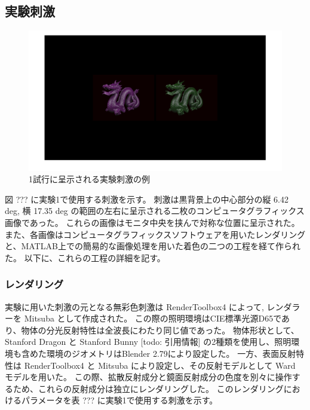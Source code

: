     \subsection{実験刺激}

        \begin{figure}[h]
            \centering
            \includegraphics[width=14.0cm]{./img/ex1_stimuli.png}
            \caption{1試行に呈示される実験刺激の例}
            \label{darkroom}
        \end{figure}

        図 ??? に実験1で使用する刺激を示す。
        刺激は黒背景上の中心部分の縦 6.42 deg, 横 17.35 deg の範囲の左右に呈示される二枚のコンピュータグラフィックス画像であった。
        これらの画像はモニタ中央を挟んで対称な位置に呈示された。
        また、各画像はコンピュータグラフィックスソフトウェアを用いたレンダリングと、MATLAB上での簡易的な画像処理を用いた着色の二つの工程を経て作られた。
        以下に、これらの工程の詳細を記す。

        \subsubsection{レンダリング}

            実験に用いた刺激の元となる無彩色刺激は RenderToolbox4 によって, レンダラーを Mitsuba として作成された。
            この際の照明環境はCIE標準光源D65であり、物体の分光反射特性は全波長にわたり同じ値であった。
            物体形状として、Stanford Dragon と Stanford Bunny [todo: 引用情報] の2種類を使用し、照明環境も含めた環境のジオメトリはBlender 2.79により設定した。
            一方、表面反射特性は RenderToolbox4 と Mitsuba により設定し、その反射モデルとして Ward モデルを用いた。
            この際、拡散反射成分と鏡面反射成分の色度を別々に操作するため、これらの反射成分は独立にレンダリングした。
            このレンダリングにおけるパラメータを表 ??? に実験1で使用する刺激を示す。

